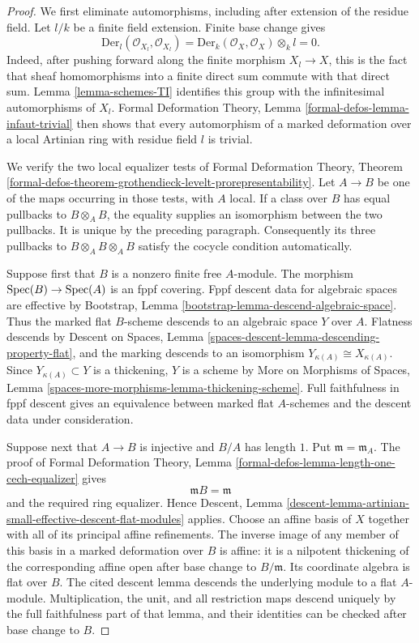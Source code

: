 \begin{proof}
We first eliminate automorphisms, including after extension of the residue
field. Let $l/k$ be a finite field extension. Finite base change gives
$$
\text{Der}_l(\mathcal{O}_{X_l}, \mathcal{O}_{X_l}) =
\text{Der}_k(\mathcal{O}_X, \mathcal{O}_X) \otimes_k l = 0.
$$
Indeed, after pushing forward along the finite morphism $X_l \to X$, this is
the fact that sheaf homomorphisms into a finite direct sum commute with that
direct sum. Lemma \ref{lemma-schemes-TI} identifies this group with the
infinitesimal automorphisms of $X_l$. Formal Deformation Theory, Lemma
\ref{formal-defos-lemma-infaut-trivial} then shows that every automorphism of
a marked deformation over a local Artinian ring with residue field $l$ is
trivial.

We verify the two local equalizer tests of Formal Deformation Theory, Theorem
\ref{formal-defos-theorem-grothendieck-levelt-prorepresentability}. Let
$A \to B$ be one of the maps occurring in those tests, with $A$ local. If a
class over $B$ has equal pullbacks to $B \otimes_A B$, the equality supplies
an isomorphism between the two pullbacks. It is unique by the preceding
paragraph. Consequently its three pullbacks to
$B \otimes_A B \otimes_A B$ satisfy the cocycle condition automatically.

Suppose first that $B$ is a nonzero finite free $A$-module. The morphism
$\mathop{\mathrm{Spec}}(B) \to \mathop{\mathrm{Spec}}(A)$ is an fppf covering. Fppf descent data for algebraic
spaces are effective by Bootstrap, Lemma
\ref{bootstrap-lemma-descend-algebraic-space}. Thus the marked flat
$B$-scheme descends to an algebraic space $Y$ over $A$. Flatness descends by
Descent on Spaces, Lemma
\ref{spaces-descent-lemma-descending-property-flat}, and the marking descends
to an isomorphism
$Y_{\kappa(A)} \cong X_{\kappa(A)}$. Since
$Y_{\kappa(A)} \subset Y$ is a thickening, $Y$ is a scheme by More on
Morphisms of Spaces, Lemma
\ref{spaces-more-morphisms-lemma-thickening-scheme}. Full faithfulness in
fppf descent gives an equivalence between marked flat $A$-schemes and the
descent data under consideration.

Suppose next that $A \to B$ is injective and $B/A$ has length $1$. Put
$\mathfrak m = \mathfrak m_A$. The proof of Formal Deformation Theory, Lemma
\ref{formal-defos-lemma-length-one-cech-equalizer} gives
$$
\mathfrak mB = \mathfrak m
$$
and the required ring equalizer. Hence Descent, Lemma
\ref{descent-lemma-artinian-small-effective-descent-flat-modules} applies.
Choose an affine basis of $X$ together with all of its principal affine
refinements. The inverse image of any member of this basis in a marked
deformation over $B$ is affine: it is a nilpotent thickening of the
corresponding affine open after base change to $B/\mathfrak m$. Its coordinate
algebra is flat over $B$. The cited descent lemma descends the underlying
module to a flat $A$-module. Multiplication, the unit, and all restriction
maps descend uniquely by the full faithfulness part of that lemma, and their
identities can be checked after base change to $B$.


\end{proof}
